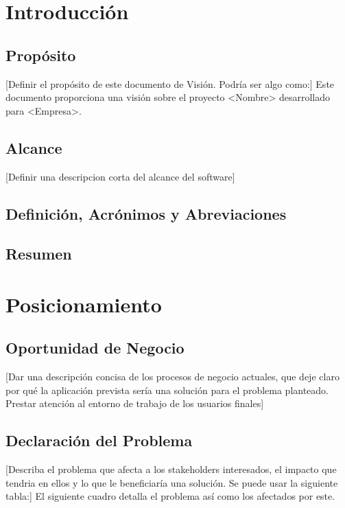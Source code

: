 \documentclass[11pt]{article}
\begin{document}
\tableofcontents
\newpage

\section{Introducción}
\subsection{Propósito}
[Definir el propósito de este documento de Visión. Podría ser algo como:]
Este documento proporciona una visión sobre el proyecto <Nombre> desarrollado para <Empresa>.

\subsection{Alcance}
[Definir una descripcion corta del alcance del software]

\subsection{Definición, Acrónimos y Abreviaciones}

\subsection{Resumen}
\newpage

\section{Posicionamiento}
\subsection{Oportunidad de Negocio}
[Dar una descripción concisa de los procesos de negocio actuales, que deje claro por qué la aplicación prevista sería una solución para el problema planteado. Prestar atención al entorno de trabajo de los usuarios finales]

\subsection{Declaración del Problema}
[Describa el problema que afecta a los stakeholders interesados, el impacto que tendria en ellos y lo que le beneficiaría una solución. Se puede usar la siguiente tabla:]
El siguiente cuadro detalla el problema así como los afectados por este.
\end{document}
